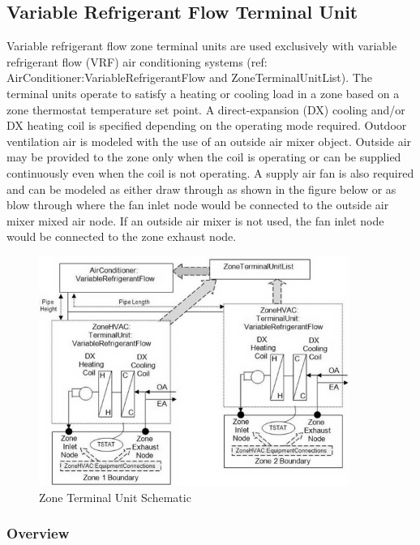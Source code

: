\subsection{Variable Refrigerant Flow Terminal Unit}\label{variable-refrigerant-flow-terminal-unit}

Variable refrigerant flow zone terminal units are used exclusively with variable refrigerant flow (VRF) air conditioning systems (ref: AirConditioner:VariableRefrigerantFlow and ZoneTerminalUnitList). The terminal units operate to satisfy a heating or cooling load in a zone based on a zone thermostat temperature set point. A direct-expansion (DX) cooling and/or DX heating coil is specified depending on the operating mode required. Outdoor ventilation air is modeled with the use of an outside air mixer object. Outside air may be provided to the zone only when the coil is operating or can be supplied continuously even when the coil is not operating. A supply air fan is also required and can be modeled as either draw through as shown in the figure below or as blow through where the fan inlet node would be connected to the outside air mixer mixed air node. If an outside air mixer is not used, the fan inlet node would be connected to the zone exhaust node.

\begin{figure}[hbtp] %
\centering
\includegraphics[width=0.9\textwidth, height=0.9\textheight, keepaspectratio=true]{media/image7369.png}
\caption{Zone Terminal Unit Schematic \protect \label{fig:zone-terminal-unit-schematic}}
\end{figure}

\subsubsection{Overview}\label{overview-10-000}

